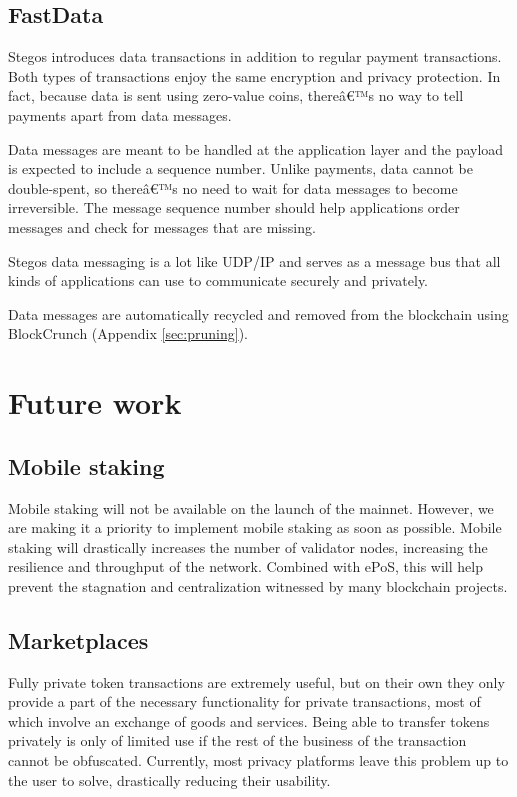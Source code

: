 \documentclass[8pt,fleqn,openany]{book}
\begin{document}
	\section{FastData}\label{sec:fastdata}
	Stegos introduces data transactions in addition to regular payment transactions. Both types of transactions enjoy the same encryption and privacy protection. In fact, because data is sent using zero-value coins, thereâ€™s no way to tell payments apart from data messages. 
	
	Data messages are meant to be handled at the application layer and the payload is expected to include a sequence number. Unlike payments, data cannot be double-spent, so thereâ€™s no need to wait for data messages to become irreversible. The message sequence number should help applications order messages and check for messages that are missing. 
	
	Stegos data messaging is a lot like UDP/IP and serves as a message bus that all kinds of applications can use to communicate securely and privately.
	
	Data messages are automatically recycled and removed from the blockchain using BlockCrunch (Appendix \ref{sec:pruning}).
	
	\chapter{Future work}\label{chap:future-work}
	
	\section{Mobile staking}\label{sec:mobile-staking}
	Mobile staking will not be available on the launch of the mainnet. However, we are making it a priority to implement mobile staking as soon as possible. Mobile staking will drastically increases the number of validator nodes, increasing the resilience and throughput of the network. Combined with ePoS, this will help prevent the stagnation and centralization witnessed by many blockchain projects.
	
	\section{Marketplaces}\label{sec:marketplaces}
	Fully private token transactions are extremely useful, but on their own they only provide a part of the necessary functionality for private transactions, most of which involve an exchange of goods and services. Being able to transfer tokens privately is only of limited use if the rest of the business of the transaction cannot be obfuscated. Currently, most privacy platforms leave this problem up to the user to solve, drastically reducing their usability.
	
\end{document}
